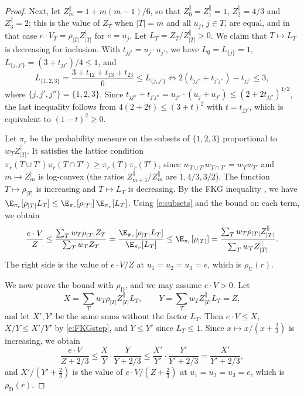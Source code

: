 \begin{proof}
Next, let $Z^\parallel_m = 1 + m(m - 1)/6$, so that $Z^\parallel_0 = Z^\parallel_1 = 1$, $Z^\parallel_2 = 4/3$ and $Z^\parallel_3 = 2$; this is the value of $Z_T$ when $|T| = m$ and all $u_j$, $j \in T$, are equal, and in that case $e \cdot V_T = \rho_{|T|} Z^\parallel_{|T|}$ for $e = u_j$. Let $L_T = Z_T / Z^\parallel_{|T|} > 0$. We claim that $T \mapsto L_T$ is decreasing for inclusion. With $t_{jj'} = u_j \cdot u_{j'}$, we have $L_\emptyset = L_{\{j\}} = 1$, $L_{\{j, j'\}} = (3 + t_{jj'})/4 \le 1$, and
\begin{equation*}
L_{\{1, 2, 3\}} = \frac{3 + t_{12} + t_{13} + t_{23}}{6} \le L_{\{j, j'\}} \iff 2 (t_{jj''} + t_{j'j''}) - t_{jj'} \le 3 ,
\end{equation*}
where $\{j, j', j''\} = \{1, 2, 3\}$. Since $t_{jj''} + t_{j'j''} = u_{j''} \cdot (u_j + u_{j'}) \le (2 + 2 t_{jj'})^{1/2}$, the last inequality follows from $4 (2 + 2t) \le (3 + t)^2$ with $t = t_{jj'}$, which is equivalent to $(1 - t)^2 \ge 0$.

Let $\pi_r$ be the probability measure on the subsets of $\{1, 2, 3\}$ proportional to $w_T Z^\parallel_{|T|}$. It satisfies the lattice condition $\pi_r(T \cup T') \pi_r(T \cap T') \ge \pi_r(T) \pi_r(T')$, since $w_{T \cup T'} w_{T \cap T'} = w_T w_{T'}$ and $m \mapsto Z^\parallel_m$ is log-convex (the ratios $Z^\parallel_{m + 1}/Z^\parallel_m$ are $1, 4/3, 3/2$). The function $T \mapsto \rho_{|T|}$ is increasing and $T \mapsto L_T$ is decreasing. By the FKG inequality \cite{FKG71}, we have $\E_{\pi_r}[\rho_{|T|} L_T] \le \E_{\pi_r}[\rho_{|T|}] \, \E_{\pi_r}[L_T]$. Using \eqref{e:subsets} and the bound on each term, we obtain
\begin{equation}\label{e:FKGstep}
\frac{e \cdot V}{Z} \le \frac{\sum_T w_T \rho_{|T|} Z_T}{\sum_T w_T Z_T} = \frac{\E_{\pi_r}[\rho_{|T|} L_T]}{\E_{\pi_r}[L_T]} \le \E_{\pi_r}[\rho_{|T|}] = \frac{\sum_T w_T \rho_{|T|} Z^\parallel_{|T|}}{\sum_T w_T Z^\parallel_{|T|}} .
\end{equation}
The right side is the value of $e \cdot V / Z$ at $u_1 = u_2 = u_3 = e$, which is $\rho_{\mathrm U}(r)$.

We now prove the bound with $\rho_{\mathrm D}$, and we may assume $e \cdot V > 0$. Let
\begin{equation*}
X = \sum_T w_T \rho_{|T|} Z^\parallel_{|T|} L_T, \qquad Y = \sum_T w_T Z^\parallel_{|T|} L_T = Z ,
\end{equation*}
and let $X', Y'$ be the same sums without the factor $L_T$. Then $e \cdot V \le X$, $X/Y \le X'/Y'$ by \eqref{e:FKGstep}, and $Y \le Y'$ since $L_T \le 1$. Since $x \mapsto x/(x + \frac23)$ is increasing, we obtain
\begin{equation*}
\frac{e \cdot V}{Z + 2/3} \le \frac XY \cdot \frac{Y}{Y + 2/3} \le \frac{X'}{Y'} \cdot \frac{Y'}{Y' + 2/3} = \frac{X'}{Y' + 2/3} ,
\end{equation*}
and $X' / (Y' + \frac23)$ is the value of $e \cdot V / (Z + \frac23)$ at $u_1 = u_2 = u_3 = e$, which is $\rho_{\mathrm D}(r)$.
\end{proof}

